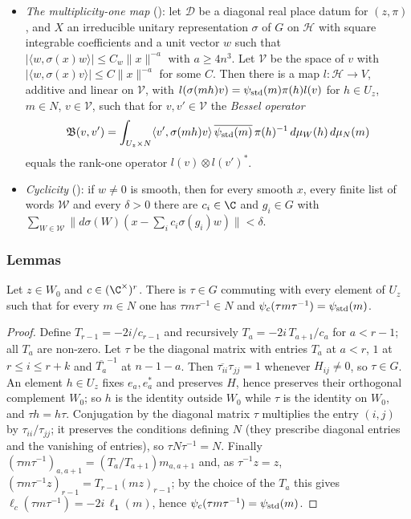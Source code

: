 \begin{itemize}
\item \emph{The multiplicity-one map} (): let
$\mathcal D$ be a diagonal real place datum for $(z,\pi)$, and $X$ an irreducible unitary representation $\sigma$ of
$G$ on $\mathcal H$ with square integrable coefficients and a unit vector $w$ such that
$|\langle w,\sigma(x)w\rangle|\le C_w\|x\|^{-a}$ with $a\ge4n^3$. Let $\mathcal V$ be the space of $v$ with
$|\langle w,\sigma(x)v\rangle|\le C\|x\|^{-a}$ for some $C$. Then there is a map $l:\mathcal H\to V$, additive and
linear on $\mathcal V$, with $l(\sigma(mh)v)=\psi_{\mathrm{std}}(m)\pi(h)l(v)$ for $h\in U_z$, $m\in N$, $v\in\mathcal V$,
such that for $v,v'\in\mathcal V$ the \emph{Bessel operator}
\begin{equation}\label{eq:pf:sh-local:beop}
\mathfrak B(v,v')=\int_{U_z\times N}\langle v',\sigma(mh)v\rangle\,\overline{\psi_{\mathrm{std}}(m)}\,\pi(h)^{-1}\,d\mu_W(h)\,d\mu_N(m)
\end{equation}
equals the rank-one operator $l(v)\otimes l(v')^*$.
\item \emph{Cyclicity} (): if $w\ne0$ is smooth, then for every
smooth $x$, every finite list of words $\mathcal W$ and every $\delta>0$ there are $c_i\in\C$ and $g_i\in G$ with
$\sum_{W\in\mathcal W}\|d\sigma(W)(x-\sum_ic_i\sigma(g_i)w)\|<\delta$.
\end{itemize}

\subsubsection{Lemmas}

\begin{lemma}\label{pf:sh-local:torconj}
Let $z\in W_0$ and $c\in(\C^\times)^r$. There is $\tau\in G$ commuting with every element of $U_z$ such that for
every $m\in N$ one has $\tau m\tau^{-1}\in N$ and $\psi_c(\tau m\tau^{-1})=\psi_{\mathrm{std}}(m)$.
\end{lemma}

\begin{proof}
Define $T_{r-1}=-2i/c_{r-1}$ and recursively $T_a=-2i\,T_{a+1}/c_a$ for $a<r-1$; all $T_a$ are non-zero. Let
$\tau$ be the diagonal matrix with entries $T_a$ at $a<r$, $1$ at $r\le i\le r+k$ and $\overline{T_a}^{-1}$ at
$n-1-a$. Then $\overline{\tau_{ii}}\tau_{jj}=1$ whenever $H_{ij}\ne0$, so $\tau\in G$. An element $h\in U_z$ fixes
$e_a,e_a^*$ and preserves $H$, hence preserves their orthogonal complement $W_0$; so $h$ is the identity outside
$W_0$ while $\tau$ is the identity on $W_0$, and $\tau h=h\tau$. Conjugation by the diagonal matrix $\tau$
multiplies the entry $(i,j)$ by $\tau_{ii}/\tau_{jj}$; it preserves the conditions defining $N$ (they prescribe
diagonal entries and the vanishing of entries), so $\tau N\tau^{-1}=N$. Finally
$(\tau m\tau^{-1})_{a,a+1}=(T_a/T_{a+1})m_{a,a+1}$ and, as $\tau^{-1}z=z$,
$(\tau m\tau^{-1}z)_{r-1}=T_{r-1}(mz)_{r-1}$; by the choice of the $T_a$ this gives
$\ell_c(\tau m\tau^{-1})=-2i\,\ell_{\mathbf 1}(m)$, hence $\psi_c(\tau m\tau^{-1})=\psi_{\mathrm{std}}(m)$.
\end{proof}

